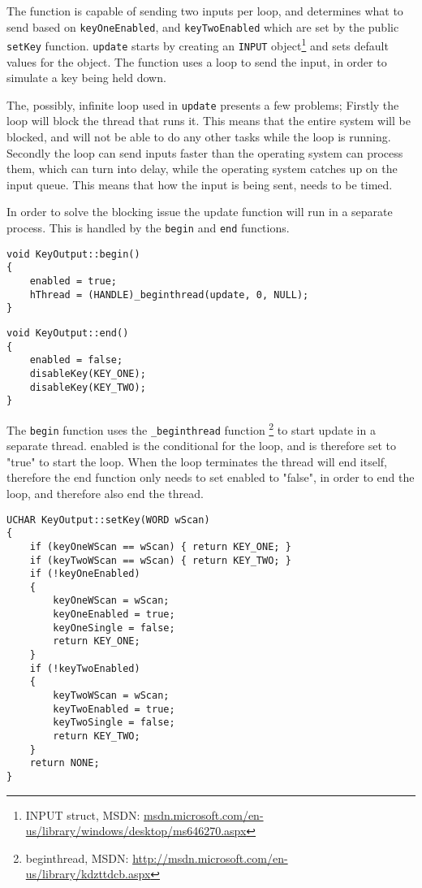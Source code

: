 The function is capable of sending two inputs per loop, and determines what to send based on \texttt{keyOneEnabled}, and \texttt{keyTwoEnabled} which are set by the public \texttt{setKey} function. 
\texttt{update} starts by creating an \texttt{INPUT}
object\footnote{INPUT struct, MSDN: \url{msdn.microsoft.com/en-us/library/windows/desktop/ms646270.aspx}} and sets default values for the object. 
The function uses a loop to send the input, in order to simulate a key being held down.
\bigskip

The, possibly, infinite loop used in \texttt{update} presents a few problems;
Firstly the loop will block the thread that runs it. This means that the entire
system will be blocked, and will not be able to do any other tasks while the loop is running. Secondly the
loop can send inputs faster than the operating system can process them, which
can turn into delay, while the operating system catches up on the input queue.
This means that how the input is being sent, needs to be timed.
\bigskip

In order to solve the blocking issue the update function will run in a separate
process. This is handled by the \texttt{begin} and \texttt{end} functions.
\bigskip

\begin{lstlisting}[caption=KeyOutput begin thread function, label=lst:lst12]
void KeyOutput::begin() 
{ 
    enabled = true;
    hThread = (HANDLE)_beginthread(update, 0, NULL);
}
\end{lstlisting}

\begin{lstlisting}[caption=KeyOutput end thread function, label=lst:lst13]
void KeyOutput::end() 
{
    enabled = false;
    disableKey(KEY_ONE);
    disableKey(KEY_TWO);
}
\end{lstlisting}

The \texttt{begin} function uses the \texttt{\_beginthread} function \footnote{beginthread, MSDN: \url{http://msdn.microsoft.com/en-us/library/kdzttdcb.aspx}} to
start update in a separate thread. enabled is the conditional for the loop, and
is therefore set to "true" to start the loop. When the loop terminates the thread
will end itself, therefore the end function only needs to set enabled to "false",
in order to end the loop, and therefore also end the thread.

\begin{lstlisting}[caption=KeyOutput setKey function, label=lst:lst14]
UCHAR KeyOutput::setKey(WORD wScan) 
{ 
    if (keyOneWScan == wScan) { return KEY_ONE; } 
    if (keyTwoWScan == wScan) { return KEY_TWO; }
    if (!keyOneEnabled) 
    { 
        keyOneWScan = wScan;
        keyOneEnabled = true;
        keyOneSingle = false;
        return KEY_ONE; 
    } 
    if (!keyTwoEnabled) 
    { 
        keyTwoWScan = wScan; 
        keyTwoEnabled = true; 
        keyTwoSingle = false; 
        return KEY_TWO; 
    } 
    return NONE;  
}
\end{lstlisting}

